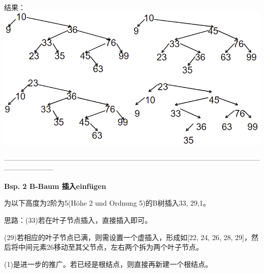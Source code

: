 \documentclass[fleqn]{article}
\begin{document}
\begin{center}
    结果：
    \includegraphics[scale=0.5]{28.png}
\end{center}

\noindent---------------------------------------------------------------------------------------------------------------------------------

\noindent\textbf{Bsp. 2 B-Baum 插入einfügen}

为以下高度为2阶为5(Höhe 2 und Ordnung 5)的B树插入33, 29,1。

思路：(33)若在叶子节点插入，直接插入即可。

(29)若相应的叶子节点已满，则需设置一个虚插入，形成如[22, 24, 26, 28, 29]，然后将中间元素26移动至其父节点，左右两个拆为两个叶子节点。

(1)是进一步的推广。若已经是根结点，则直接再新建一个根结点。
\end{document}

